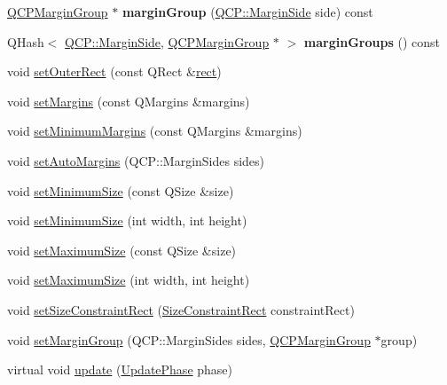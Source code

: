 \begin{DoxyCompactItemize}
\hyperlink{classQCPMarginGroup}{Q\+C\+P\+Margin\+Group} $\ast$ {\bfseries margin\+Group} (\hyperlink{namespaceQCP_a7e487e3e2ccb62ab7771065bab7cae54}{Q\+C\+P\+::\+Margin\+Side} side) const
\item 
\mbox{\label{classQCPLayoutElement_ac8d1139a81a1625860647e307ae2b733}} 
Q\+Hash$<$ \hyperlink{namespaceQCP_a7e487e3e2ccb62ab7771065bab7cae54}{Q\+C\+P\+::\+Margin\+Side}, \hyperlink{classQCPMarginGroup}{Q\+C\+P\+Margin\+Group} $\ast$ $>$ {\bfseries margin\+Groups} () const
\item 
void \hyperlink{classQCPLayoutElement_a38975ea13e36de8e53391ce41d94bc0f}{set\+Outer\+Rect} (const Q\+Rect \&\hyperlink{classQCPLayoutElement_a208effccfe2cca4a0eaf9393e60f2dd4}{rect})
\item 
void \hyperlink{classQCPLayoutElement_a8f450b1f3f992ad576fce2c63d8b79cf}{set\+Margins} (const Q\+Margins \&margins)
\item 
void \hyperlink{classQCPLayoutElement_a0a8a17abc16b7923159fcc7608f94673}{set\+Minimum\+Margins} (const Q\+Margins \&margins)
\item 
void \hyperlink{classQCPLayoutElement_accfda49994e3e6d51ed14504abf9d27d}{set\+Auto\+Margins} (Q\+C\+P\+::\+Margin\+Sides sides)
\item 
void \hyperlink{classQCPLayoutElement_a5dd29a3c8bc88440c97c06b67be7886b}{set\+Minimum\+Size} (const Q\+Size \&size)
\item 
void \hyperlink{classQCPLayoutElement_a8e0447614a0bf92de9a7304588c6b96e}{set\+Minimum\+Size} (int width, int height)
\item 
void \hyperlink{classQCPLayoutElement_a74eb5280a737ab44833d506db65efd95}{set\+Maximum\+Size} (const Q\+Size \&size)
\item 
void \hyperlink{classQCPLayoutElement_a03e0e9c48f230217c529b0819f832d84}{set\+Maximum\+Size} (int width, int height)
\item 
void \hyperlink{classQCPLayoutElement_a361666cdcc6fbfd37344cc44be746b0f}{set\+Size\+Constraint\+Rect} (\hyperlink{classQCPLayoutElement_a0afb3e5773529e4bd20e448f81be4d2a}{Size\+Constraint\+Rect} constraint\+Rect)
\item 
void \hyperlink{classQCPLayoutElement_a516e56f76b6bc100e8e71d329866847d}{set\+Margin\+Group} (Q\+C\+P\+::\+Margin\+Sides sides, \hyperlink{classQCPMarginGroup}{Q\+C\+P\+Margin\+Group} $\ast$group)
\item 
virtual void \hyperlink{classQCPLayoutElement_a929c2ec62e0e0e1d8418eaa802e2af9b}{update} (\hyperlink{classQCPLayoutElement_a0d83360e05735735aaf6d7983c56374d}{Update\+Phase} phase)

\end{DoxyCompactItemize}
